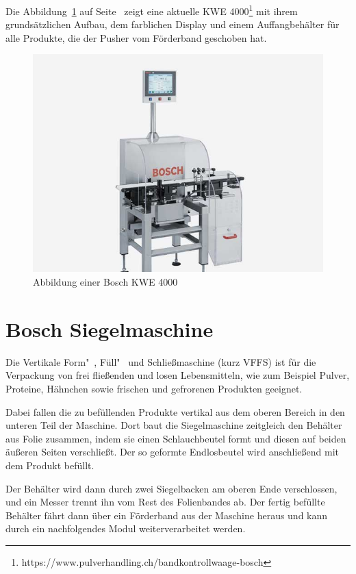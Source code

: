 Die Abbildung~\ref{fig:grundlagen_boschkwe} auf Seite~\pageref{fig:grundlagen_boschkwe} zeigt eine aktuelle
KWE 4000\footnote{https://www.pulverhandling.ch/bandkontrollwaage-bosch} mit ihrem grundsätzlichen Aufbau, dem
farblichen Display und einem Auffangbehälter für alle Produkte, die der Pusher vom Förderband geschoben hat.

\begin{figure}[h]
    \centering
    \includegraphics[scale=0.4]{images/kapitel_2/bosch_kwe.jpg}
    \caption{Abbildung einer Bosch KWE 4000}
    \label{fig:grundlagen_boschkwe}
\end{figure}

\section{Bosch Siegelmaschine}
Die Vertikale Form"~, Füll"~ und Schließmaschine (kurz VFFS) ist für die Verpackung von  frei fließenden und losen
Lebensmitteln, wie zum Beispiel Pulver, Proteine, Hähnchen sowie frischen und gefrorenen Produkten geeignet.

Dabei fallen die zu befüllenden Produkte vertikal aus dem oberen Bereich in den unteren Teil der Maschine. Dort baut
die Siegelmaschine zeitgleich den Behälter aus Folie zusammen, indem sie einen Schlauchbeutel formt und diesen auf
beiden äußeren Seiten verschließt. Der so geformte Endlosbeutel wird anschließend mit dem Produkt befüllt.

Der Behälter wird dann durch zwei Siegelbacken am oberen Ende verschlossen, und ein Messer trennt ihn vom Rest des
Folienbandes ab. Der fertig befüllte Behälter fährt dann über ein Förderband aus der Maschine heraus und kann
durch ein nachfolgendes Modul weiterverarbeitet werden.

